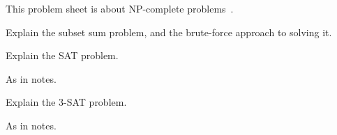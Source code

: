 

\noindent
This problem sheet is about NP-complete problems~\cite{sipserbook}.

\begin{questions}


\question
Explain the subset sum problem, and the brute-force approach to solving it.




\question
Explain the SAT problem.
\begin{solution}
As in notes.
\end{solution}

\question
Explain the 3-SAT problem.
\begin{solution}
As in notes.
\end{solution}





\end{questions}
